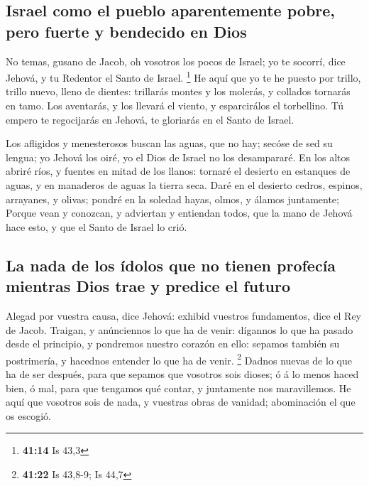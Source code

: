 \hypertarget{israel-como-el-pueblo-aparentemente-pobre-pero-fuerte-y-bendecido-en-dios}{%
\subsection{Israel como el pueblo aparentemente pobre, pero fuerte y
bendecido en
Dios}\label{israel-como-el-pueblo-aparentemente-pobre-pero-fuerte-y-bendecido-en-dios}}

 No temas, gusano de Jacob, oh vosotros los pocos de
Israel; yo te socorrí, dice Jehová, y tu Redentor el Santo de Israel.
\footnote{\textbf{41:14} Is 43,3}  He aquí que yo te he
puesto por trillo, trillo nuevo, lleno de dientes: trillarás montes y
los molerás, y collados tornarás en tamo.  Los aventarás,
y los llevará el viento, y esparcirálos el torbellino. Tú empero te
regocijarás en Jehová, te gloriarás en el Santo de Israel.

 Los afligidos y menesterosos buscan las aguas, que no
hay; secóse de sed su lengua; yo Jehová los oiré, yo el Dios de Israel
no los desampararé.  En los altos abriré ríos, y fuentes
en mitad de los llanos: tornaré el desierto en estanques de aguas, y en
manaderos de aguas la tierra seca.  Daré en el desierto
cedros, espinos, arrayanes, y olivas; pondré en la soledad hayas, olmos,
y álamos juntamente;  Porque vean y conozcan, y adviertan
y entiendan todos, que la mano de Jehová hace esto, y que el Santo de
Israel lo crió.

\hypertarget{la-nada-de-los-uxeddolos-que-no-tienen-profecuxeda-mientras-dios-trae-y-predice-el-futuro}{%
\subsection{La nada de los ídolos que no tienen profecía mientras Dios
trae y predice el
futuro}\label{la-nada-de-los-uxeddolos-que-no-tienen-profecuxeda-mientras-dios-trae-y-predice-el-futuro}}

 Alegad por vuestra causa, dice Jehová: exhibid vuestros
fundamentos, dice el Rey de Jacob.  Traigan, y
anúnciennos lo que ha de venir: dígannos lo que ha pasado desde el
principio, y pondremos nuestro corazón en ello: sepamos también su
postrimería, y hacednos entender lo que ha de venir. \footnote{\textbf{41:22}
  Is 43,8-9; Is 44,7}  Dadnos nuevas de lo que ha de ser
después, para que sepamos que vosotros sois dioses; ó á lo menos haced
bien, ó mal, para que tengamos qué contar, y juntamente nos
maravillemos.  He aquí que vosotros sois de nada, y
vuestras obras de vanidad; abominación el que os escogió.

